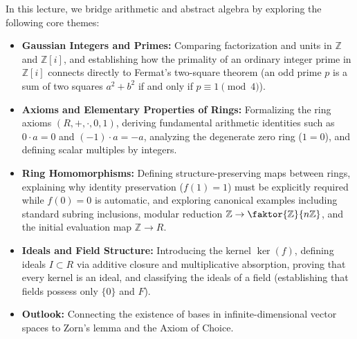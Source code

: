 

\begin{overview}
In this lecture, we bridge arithmetic and abstract algebra by exploring the following core themes:
\begin{itemize}
    \item \textbf{Gaussian Integers and Primes:} Comparing factorization and units in $\mathbb{Z}$ and $\mathbb{Z}[i]$, and establishing how the primality of an ordinary integer prime in $\mathbb{Z}[i]$ connects directly to Fermat's two-square theorem (an odd prime $p$ is a sum of two squares $a^2 + b^2$ if and only if $p \equiv 1 \pmod 4$).
    \item \textbf{Axioms and Elementary Properties of Rings:} Formalizing the ring axioms $(R, +, \cdot, 0, 1)$, deriving fundamental arithmetic identities such as $0 \cdot a = 0$ and $(-1) \cdot a = -a$, analyzing the degenerate zero ring ($1 = 0$), and defining scalar multiples by integers.
    \item \textbf{Ring Homomorphisms:} Defining structure-preserving maps between rings, explaining why identity preservation ($f(1) = 1$) must be explicitly required while $f(0) = 0$ is automatic, and exploring canonical examples including standard subring inclusions, modular reduction $\mathbb{Z} \to \faktor{\mathbb{Z}}{n\mathbb{Z}}$, and the initial evaluation map $\mathbb{Z} \to R$.
    \item \textbf{Ideals and Field Structure:} Introducing the kernel $\ker(f)$, defining ideals $I \subset R$ via additive closure and multiplicative absorption, proving that every kernel is an ideal, and classifying the ideals of a field (establishing that fields possess only $\{0\}$ and $F$).
    \item \textbf{Outlook:} Connecting the existence of bases in infinite-dimensional vector spaces to Zorn's lemma and the Axiom of Choice.
\end{itemize}
\end{overview}

